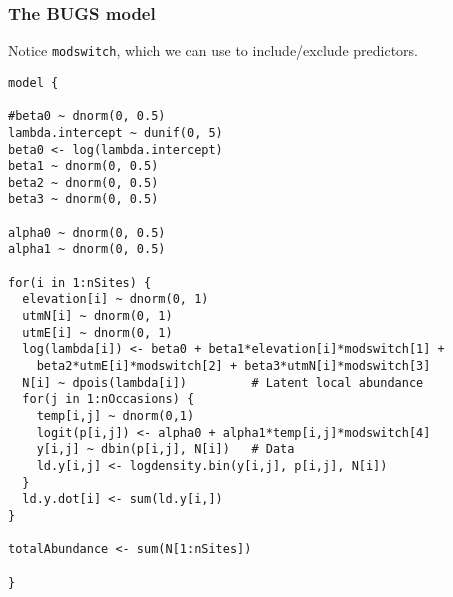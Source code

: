 \documentclass[color=usenames,dvipsnames]{beamer}\usepackage[]{graphicx}\usepackage[]{xcolor}
\makeatletter
\newenvironment{kframe}{%
 \def\at@end@of@kframe{}%
 \ifinner\ifhmode%
  \def\at@end@of@kframe{\end{minipage}}%
  \begin{minipage}{\columnwidth}%
 \fi\fi%
 \def\FrameCommand##1{\hskip\@totalleftmargin \hskip-\fboxsep
 \colorbox{shadecolor}{##1}\hskip-\fboxsep
     \hskip-\linewidth \hskip-\@totalleftmargin \hskip\columnwidth}%
 \MakeFramed {\advance\hsize-\width
   \@totalleftmargin\z@ \linewidth\hsize
   \@setminipage}}%
 {\par\unskip\endMakeFramed%
 \at@end@of@kframe}
\newenvironment{knitrout}{}{} %
\makeatother
\begin{document}
\begin{frame}[fragile]
  \frametitle{The BUGS model}
  \small
  Notice \alert{\tt modswitch}, which we can use to include/exclude
  predictors. 
  \tiny
\begin{knitrout}\tiny
{}\color{fgcolor}\begin{kframe}
\begin{verbatim}
model {

#beta0 ~ dnorm(0, 0.5)  
lambda.intercept ~ dunif(0, 5)
beta0 <- log(lambda.intercept)
beta1 ~ dnorm(0, 0.5)
beta2 ~ dnorm(0, 0.5)
beta3 ~ dnorm(0, 0.5)

alpha0 ~ dnorm(0, 0.5)  
alpha1 ~ dnorm(0, 0.5)

for(i in 1:nSites) {
  elevation[i] ~ dnorm(0, 1)
  utmN[i] ~ dnorm(0, 1)
  utmE[i] ~ dnorm(0, 1)
  log(lambda[i]) <- beta0 + beta1*elevation[i]*modswitch[1] +
    beta2*utmE[i]*modswitch[2] + beta3*utmN[i]*modswitch[3] 
  N[i] ~ dpois(lambda[i])         # Latent local abundance
  for(j in 1:nOccasions) {
    temp[i,j] ~ dnorm(0,1)
    logit(p[i,j]) <- alpha0 + alpha1*temp[i,j]*modswitch[4]
    y[i,j] ~ dbin(p[i,j], N[i])   # Data
    ld.y[i,j] <- logdensity.bin(y[i,j], p[i,j], N[i])
  }
  ld.y.dot[i] <- sum(ld.y[i,])
}

totalAbundance <- sum(N[1:nSites])

}
\end{verbatim}
\end{kframe}
\end{knitrout}

\end{frame}
\end{document}
